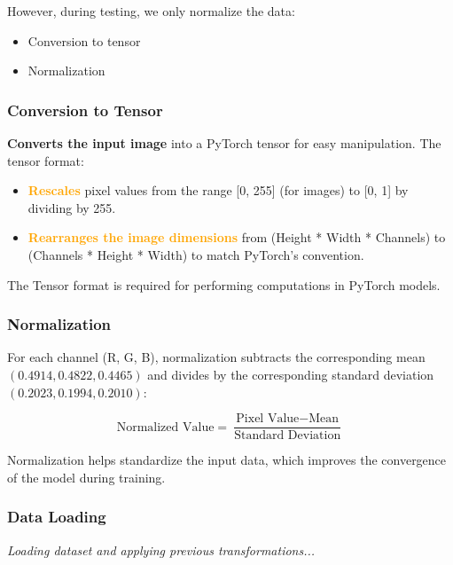 However, during testing, we only normalize the data:
\begin{itemize}
    \item Conversion to tensor
    \item Normalization
\end{itemize}

\subsubsection{Conversion to Tensor}
\textbf{Converts the input image} into a PyTorch tensor for easy manipulation. The tensor format:
\begin{itemize}
    \item \textcolor{orange}{\textbf{Rescales}} pixel values from the range [0, 255] (for images) 
    to [0, 1] by dividing by 255.
    \item \textcolor{orange}{\textbf{Rearranges the image dimensions}} from (Height * Width * Channels)
    to (Channels * Height * Width) to match PyTorch's convention.
\end{itemize}

The Tensor format is required for performing computations in PyTorch models.

\subsubsection{Normalization}
For each channel (R, G, B), normalization subtracts the corresponding mean $(0.4914, 0.4822, 0.4465)$ 
and divides by the corresponding standard deviation $(0.2023, 0.1994, 0.2010)$:

$$\text{Normalized Value} = \frac{\text{Pixel Value} - \text{Mean}}{\text{Standard Deviation}}$$

Normalization helps standardize the input data, which improves the convergence of the model during 
training.

\subsubsection{Data Loading}
\textit{Loading dataset and applying previous transformations...}

